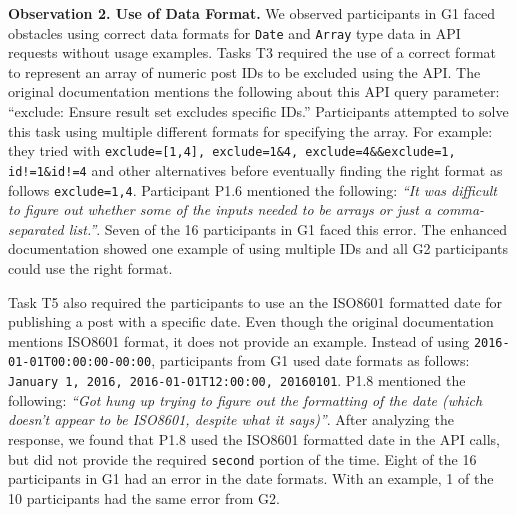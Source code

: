\documentclass[conference]{IEEEtran}
\begin{document}
\hspace{-5mm}
\vspace{0.5mm}


\textbf{Observation 2. Use of Data Format.} We observed participants in G1 faced obstacles using correct data formats for \lstinline{Date} and \lstinline{Array} type data in API requests without usage examples. Tasks T3 required the use of a correct format to represent an array of numeric post IDs to be excluded using the API. The original documentation mentions the following about this API query parameter: ``exclude: Ensure result set excludes specific IDs.'' Participants attempted to solve this task using multiple different formats for specifying the array. For example: they tried with \lstinline{exclude=[1,4], exclude=1&4, exclude=4&&exclude=1, id!=1&id!=4} and other alternatives before eventually finding the right format as follows \lstinline{exclude=1,4}. Participant P1.6 mentioned the following: \textit{``It was difficult to figure out whether some of the inputs needed to be arrays or just a comma-separated list.''}. Seven of the 16 participants in G1 faced this error. The enhanced documentation showed one example of using multiple IDs and all G2 participants could use the right format.

Task T5 also required the participants to use an the ISO8601 formatted date for publishing a post with a specific date. Even though the original documentation mentions ISO8601 format, it does not provide an example. Instead of using \lstinline{2016-01-01T00:00:00-00:00}, participants from G1 used date formats as follows: \lstinline{January 1, 2016, 2016-01-01T12:00:00, 20160101}. P1.8 mentioned the following: \textit{``Got hung up trying to figure out the formatting of the date (which doesn't appear to be ISO8601, despite what it says)''}. After analyzing the response, we found that P1.8 used the ISO8601 formatted date in the API calls, but did not provide the required \lstinline{second} portion of the time. Eight of the 16 participants in G1 had an error in the date formats. With an example, 1 of the 10 participants had the same error from G2.
\end{document}

